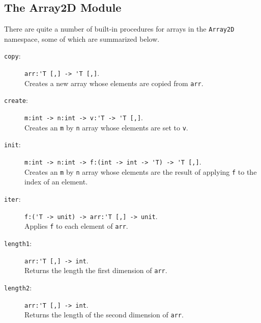 \documentclass[springer.tex]{subfiles}
\begin{document}
\subsection{The Array2D Module}
There are quite a number of built-in procedures for arrays in the \lstinline{Array2D} namespace, some of which are summarized below.
\begin{description}
\item[\texttt{copy}:] \lstinline{arr:'T [,] -> 'T [,]}.~\\
  Creates a new array whose elements are copied from \lstinline{arr}.
\item[\texttt{create}:] \lstinline{m:int -> n:int -> v:'T -> 'T [,]}.~\\
  Creates an \lstinline{m} by \lstinline{n} array whose elements are set to \lstinline{v}.
\item[\texttt{init}:] \lstinline{m:int -> n:int -> f:(int -> int -> 'T) -> 'T [,]}.~\\
  Creates an \lstinline{m} by \lstinline{n} array whose elements are the result of applying \lstinline{f} to the index of an element.
\item[\texttt{iter}:] \lstinline{f:('T -> unit) -> arr:'T [,] -> unit}.~\\
  Applies \lstinline{f} to each element of \lstinline{arr}.
\item[\texttt{length1}:] \lstinline{arr:'T [,] -> int}.~\\
  Returns the length the first dimension of \lstinline{arr}.
\item[\texttt{length2}:] \lstinline{arr:'T [,] -> int}.~\\
  Returns the length of the second dimension of \lstinline{arr}.

\end{description}
\end{document}
